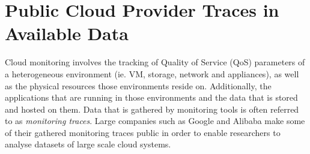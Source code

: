 






    \section{Public Cloud Provider Traces in Available Data}
    \label{sec:public-cloud-provider-traces-in-available-data-related-work}

        Cloud monitoring involves the tracking of Quality of Service (QoS) parameters of a heterogeneous environment (ie. VM, storage, network and appliances), as well as the physical resources those environments reside on. Additionally, the applications that are running in those environments and the data that is stored and hosted on them.
        Data that is gathered by monitoring tools is often referred to as \emph{monitoring traces}.
        Large companies such as Google and Alibaba make some of their gathered monitoring traces public in order to enable researchers to analyse datasets of large scale cloud systems.

    
